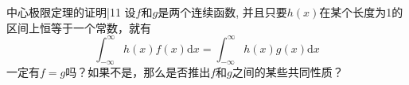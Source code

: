 \newChapter 中心极限定理的证明|{11}
\exer 设$f$和$g$是两个连续函数, 并且只要$h(x)$在某个长度为1的区间上恒等于一个常数，就有
\[\int_{-\infty}^\infty h(x)f(x)\mathrm dx=\int_{-\infty}^\infty h(x)g(x)\mathrm dx\]
一定有$f=g$吗？如果不是，那么是否推出$f$和$g$之间的某些共同性质？